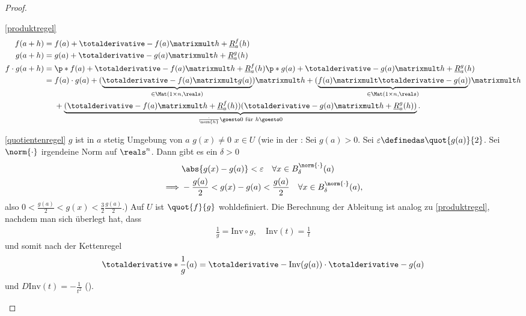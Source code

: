 \begin{proof}
    \begin{proofdescription}
        \item[\ref{produktregel}]
        \begin{align*}
            f(a+h)&=f(a)+\totalderivative-{f}(a)\matrixmult h+\underline{R}_{a}^f(h)\\
            g(a+h)&=g(a)+\totalderivative-{g}(a)\matrixmult h+\underline{R}_{a}^g(h)\\
            f\cdot g(a+h)&\begin{aligned}[t]
                &=\p*{ f(a)+\totalderivative-{f}(a)\matrixmult h+\underline{R}_{a}^f(h) }\p*{ g(a)+\totalderivative-{g}(a)\matrixmult h+\underline{R}_{a}^g(h) }\\
                &=\begin{aligned}[t]
                    &f(a)\cdot g(a)+(\underbrace{\totalderivative-{f}(a)\matrixmult g(a)}_{\in \Mat(1\times n,\reals)})\matrixmult h+(\underbrace{f(a)\matrixmult \totalderivative-{g}(a)}_{\in \Mat(1\times n,\reals)})\matrixmult h\\
                    &+\underbrace{(\totalderivative-{f}(a)\matrixmult h+\underline{R}_a^f(h))(\totalderivative-{g}(a)\matrixmult h+\underline{R}_a^g(h))}_{\frac{\cdot}{\norm{h}}\goesto 0 \text{ für }h\goesto 0}.
                \end{aligned}
            \end{aligned}            
        \end{align*}
        \item[\ref{quotientenregel}] \( g \) ist in \( a \) stetig \timplies \texists Umgebung von \( a \) \sd \( g(x)\neq 0 \) \tforall \( x\in U \) (wie in der : Sei \obda \( g(a)>0 \). Sei \( \varepsilon\definedas \quot{g(a)}{2} \). Sei \( \norm{\cdot} \) irgendeine Norm auf \( \reals^n \). Dann gibt es ein \( \delta>0 \) \sd
        \begin{align*}
            &\abs{g(x)-g(a)}<\varepsilon\quad \forall x\in B_{\delta}^{\norm{\cdot}}(a)\\
            \implies &-\frac{g(a)}{2}<g(x)-g(a)<\frac{g(a)}{2}\quad \forall x\in B_{\delta}^{\norm{\cdot}}(a),
        \end{align*}
        also \( 0<\frac{g(a)}{2}<g(x)<\frac{3}{2}\frac{g(a)}{2} \).) \timplies Auf \( U \) ist \( \quot{f}{g} \) wohldefiniert. Die Berechnung der Ableitung ist analog zu \ref{produktregel}, nachdem man sich überlegt hat, dass
        \begin{align*}
            \frac{1}{g}=\text{Inv}\circ g,\quad \text{Inv}(t)=\frac{1}{t}
        \end{align*}
        und somit nach der Kettenregel
        \begin{align*}
            \totalderivative*{\frac{1}{g}}(a)=\totalderivative-{\text{Inv}(g(a))}\cdot \totalderivative-{g}(a)
        \end{align*}
        und \( D \text{Inv}(t)=-\frac{1}{t^2} \) ().
    \end{proofdescription}    
\end{proof}
